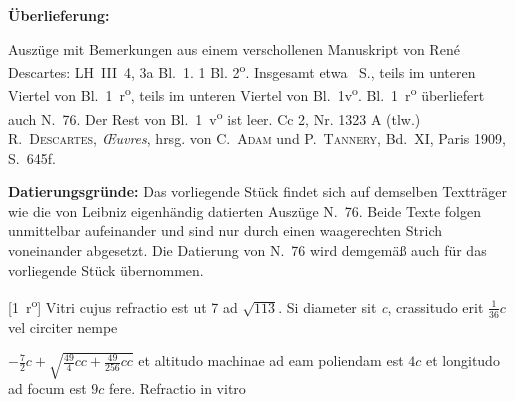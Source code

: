 \begin{ledgroupsized}[r]{120mm}%
\footnotesize%
\pstart%
\noindent\textbf{\"{U}berlieferung:}%
\pend%
\end{ledgroupsized}%
\begin{ledgroupsized}[r]{114mm}%
\footnotesize%
\pstart%
\parindent -6mm%
%
Auszüge mit Bemerkungen aus einem verschollenen Manuskript von René Descartes:
LH~III~4, 3a Bl.~1.
1 Bl. 2\textsuperscript{o}. Insgesamt etwa ~S., teils im unteren Viertel von Bl.~1~r\textsuperscript{o}, teils im unteren Viertel von Bl.~1v\textsuperscript{o}.
Bl.~1~r\textsuperscript{o} überliefert auch N.~76. %
Der Rest von Bl.~1~v\textsuperscript{o} ist leer.
\newline%
Cc 2, Nr. 1323 A (tlw.)%
\pend%
%
\pstart%
\parindent -6mm%
%
\cite{00120}\textsc{R.~Descartes}, \textit{{\OE}uvres}, hrsg. von \textsc{C.~Adam} und \textsc{P.~Tannery}, Bd.~XI, Paris 1909, S.~645f.
\pend%
\end{ledgroupsized}%
%
\vspace*{5mm}%
\begin{ledgroup}%
\footnotesize%
\pstart%
\noindent%
\footnotesize{%
\textbf{Datierungsgr\"{u}nde:}
Das vorliegende Stück findet sich auf demselben Textträger wie die von Leibniz eigenhändig datierten Auszüge N.~76. 
Beide Texte folgen unmittelbar aufeinander und sind nur durch einen waagerechten Strich voneinander abgesetzt.
Die Datierung von N.~76 %
wird demgemäß auch für das vorliegende Stück übernommen.%
}%
\pend%
\end{ledgroup}%
%
%
\vspace*{8mm}%
\pstart%
\normalsize%
\noindent%
[1~r\textsuperscript{o}] \protect{}
Vitri cujus refractio est ut 7 ad $\sqrt{\displaystyle113}$.
Si diameter sit \textit{c}, crassitudo erit $\displaystyle\frac{1}{36}c$
vel circiter nempe \rule[-4mm]{0mm}{10mm}$\displaystyle-\frac{7}{2}c + \sqrt{\displaystyle\frac{49}{4}cc + \displaystyle\frac{49}{256}cc}$
et altitudo machinae ad eam poliendam est $4c$ et longitudo ad focum est $9c$ fere.
\pend%
%
\pstart%
Refractio\protect{} in vitro

